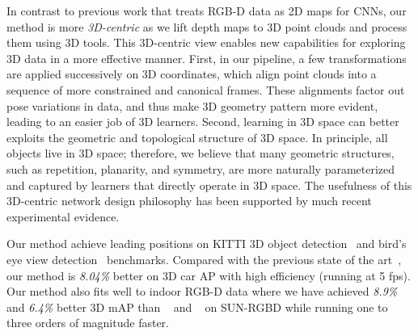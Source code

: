 In contrast to previous work that treats RGB-D data as 2D maps for CNNs, our method is more \emph{3D-centric} as we lift depth maps to 3D point clouds and process them using 3D tools. This 3D-centric view enables new capabilities for exploring 3D data in a more effective manner. First, in our pipeline, a few transformations are applied successively on 3D coordinates, which align point clouds into a sequence of more constrained and canonical frames.
These alignments factor out pose variations in data, and thus make 3D geometry pattern more evident, leading to an easier job of 3D learners.
Second, learning in 3D space can better exploits the geometric and topological structure of 3D space.
In principle, all objects live in 3D space; therefore, we believe that many geometric structures, such as repetition, planarity, and symmetry, are more naturally parameterized and captured by learners that directly operate in 3D space. %
The usefulness of this 3D-centric network design philosophy has been supported by much recent experimental evidence.

Our method achieve leading positions on KITTI 3D object detection~\cite{kitti-3d-detection} and bird's eye view detection~\cite{kitti-3d-localization} benchmarks.
Compared with the previous state of the art~\cite{cvpr17chen}, our method is \emph{8.04\%} better on 3D car AP with high efficiency (running at 5 fps). Our method also fits well to indoor RGB-D data where we have achieved \emph{8.9\%} and \emph{6.4\%} better 3D mAP than ~\cite{lahoud20172d} and ~\cite{ren2016three} on SUN-RGBD while running one to three orders of magnitude faster.




